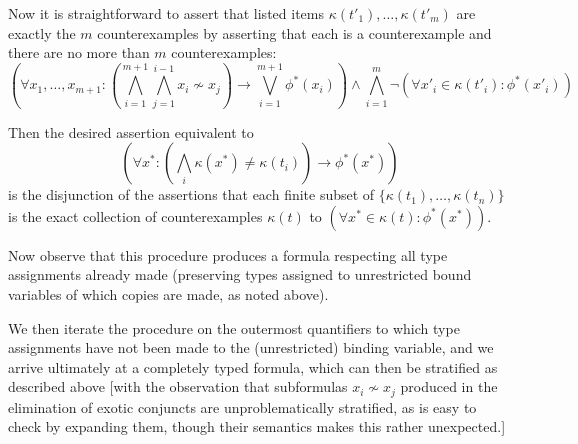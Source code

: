 \documentclass[12pt]{article}
\begin{document}
\begin{description}
Now it is straightforward to assert that listed items $\kappa(t'_1),\ldots,\kappa(t'_m)$ are exactly the $m$ counterexamples by asserting that each is a counterexample and there are no more than $m$ counterexamples:   $$(\forall x_1,\ldots,x_{m+1}: (\bigwedge_{i=1}^{m+1} \bigwedge_{j=1}^{i-1} x_i \not\sim x_j) \rightarrow \bigvee_{i=1}^{m+1}\phi^*(x_i))\wedge \bigwedge_{i=1}^m \neg(\forall x'_i \in \kappa(t'_i):\phi^*(x'_i))$$

Then the desired assertion equivalent to $$(\forall x^*:(\bigwedge_i \kappa(x^*) \neq \kappa(t_i))\rightarrow \phi^*(x^*))$$  is the disjunction of the assertions that each finite subset of $\{\kappa(t_1),\ldots,\kappa(t_n)\}$ is the exact collection of counterexamples $\kappa(t)$  to $(\forall x^* \in \kappa(t):\phi^*(x^*))$.

Now observe that this procedure produces a formula respecting all type assignments already made (preserving types assigned to unrestricted bound variables of which copies are made, as noted above).

We then iterate the procedure on the outermost quantifiers to which type assignments have not been made to the (unrestricted) binding variable, and we arrive ultimately at a completely typed formula, which can then be stratified as described above [with the observation 
that subformulas $x_i \not\sim x_j$ produced in the elimination of exotic conjuncts are unproblematically stratified, as is easy to check by expanding them, though their semantics makes this rather unexpected.]




\end{description}
\end{document}
